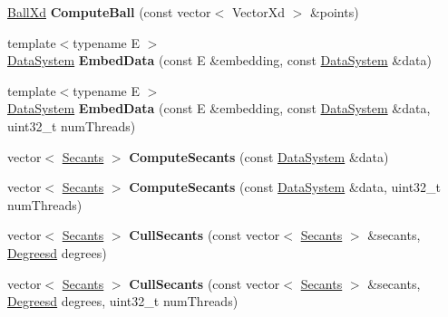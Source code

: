 \begin{DoxyCompactItemize}
\item 
\hypertarget{namespace_d_r_d_s_p_a43b75234569c1d89280be5e50df064f3}{\hyperlink{struct_d_r_d_s_p_1_1_ball}{Ball\-Xd} {\bfseries Compute\-Ball} (const vector$<$ Vector\-Xd $>$ \&points)}\label{namespace_d_r_d_s_p_a43b75234569c1d89280be5e50df064f3}

\item 
\hypertarget{namespace_d_r_d_s_p_ad378ab249fa9abf1d726e1b12bc9d7d5}{{\footnotesize template$<$typename E $>$ }\\\hyperlink{struct_d_r_d_s_p_1_1_data_system}{Data\-System} {\bfseries Embed\-Data} (const E \&embedding, const \hyperlink{struct_d_r_d_s_p_1_1_data_system}{Data\-System} \&data)}\label{namespace_d_r_d_s_p_ad378ab249fa9abf1d726e1b12bc9d7d5}

\item 
\hypertarget{namespace_d_r_d_s_p_a0cdc1c82147be28daee0ad7682c73366}{{\footnotesize template$<$typename E $>$ }\\\hyperlink{struct_d_r_d_s_p_1_1_data_system}{Data\-System} {\bfseries Embed\-Data} (const E \&embedding, const \hyperlink{struct_d_r_d_s_p_1_1_data_system}{Data\-System} \&data, uint32\-\_\-t num\-Threads)}\label{namespace_d_r_d_s_p_a0cdc1c82147be28daee0ad7682c73366}

\item 
\hypertarget{namespace_d_r_d_s_p_a2fad6e7371d3c4d68e9cebe2effa11b6}{vector$<$ \hyperlink{struct_d_r_d_s_p_1_1_secants}{Secants} $>$ {\bfseries Compute\-Secants} (const \hyperlink{struct_d_r_d_s_p_1_1_data_system}{Data\-System} \&data)}\label{namespace_d_r_d_s_p_a2fad6e7371d3c4d68e9cebe2effa11b6}

\item 
\hypertarget{namespace_d_r_d_s_p_a0e6e28872434157a54a98036959a8ca3}{vector$<$ \hyperlink{struct_d_r_d_s_p_1_1_secants}{Secants} $>$ {\bfseries Compute\-Secants} (const \hyperlink{struct_d_r_d_s_p_1_1_data_system}{Data\-System} \&data, uint32\-\_\-t num\-Threads)}\label{namespace_d_r_d_s_p_a0e6e28872434157a54a98036959a8ca3}

\item 
\hypertarget{namespace_d_r_d_s_p_a854bf76936468e08ba54d62d6f2881c4}{vector$<$ \hyperlink{struct_d_r_d_s_p_1_1_secants}{Secants} $>$ {\bfseries Cull\-Secants} (const vector$<$ \hyperlink{struct_d_r_d_s_p_1_1_secants}{Secants} $>$ \&secants, \hyperlink{struct_d_r_d_s_p_1_1_degrees}{Degreesd} degrees)}\label{namespace_d_r_d_s_p_a854bf76936468e08ba54d62d6f2881c4}

\item 
\hypertarget{namespace_d_r_d_s_p_a41194545b2e535c0cb29f117f894df46}{vector$<$ \hyperlink{struct_d_r_d_s_p_1_1_secants}{Secants} $>$ {\bfseries Cull\-Secants} (const vector$<$ \hyperlink{struct_d_r_d_s_p_1_1_secants}{Secants} $>$ \&secants, \hyperlink{struct_d_r_d_s_p_1_1_degrees}{Degreesd} degrees, uint32\-\_\-t num\-Threads)}\label{namespace_d_r_d_s_p_a41194545b2e535c0cb29f117f894df46}


\end{DoxyCompactItemize}
